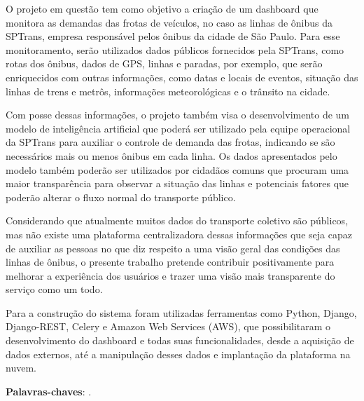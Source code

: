 \begin{resumo}
\indent
\par O projeto em questão tem como objetivo a criação de um dashboard que monitora as demandas das   frotas   de veículos, no caso as linhas de ônibus da SPTrans, empresa responsável pelos ônibus da cidade de São Paulo. Para esse monitoramento, serão utilizados dados públicos fornecidos pela SPTrans, como rotas dos ônibus, dados de GPS, linhas e paradas, por exemplo, que serão enriquecidos com outras informações, como datas e locais de eventos, situação das linhas de trens e metrôs, informações meteorológicas e o trânsito na cidade.
\par Com posse dessas informações, o projeto também visa o desenvolvimento de um modelo de inteligência artificial que poderá ser utilizado pela equipe operacional da SPTrans para auxiliar o controle de demanda das frotas, indicando se são necessários mais ou menos ônibus em cada linha. Os dados apresentados pelo modelo também poderão ser utilizados por cidadãos comuns que procuram uma maior transparência para observar a situação das linhas e potenciais fatores que poderão alterar o fluxo normal do transporte público.
\par Considerando que atualmente muitos dados do transporte coletivo são públicos, mas não existe uma plataforma centralizadora dessas informações que seja capaz de auxiliar as pessoas no que diz respeito a uma visão geral das condições das linhas de ônibus, o presente trabalho pretende contribuir positivamente para melhorar a experiência dos usuários e trazer uma visão mais transparente do serviço como um todo.
\par Para a construção do sistema foram utilizadas ferramentas como Python, Django, Django-REST, Celery e Amazon Web Services (AWS), que possibilitaram o desenvolvimento do dashboard e todas suas funcionalidades, desde a aquisição de dados externos, até a manipulação desses dados e implantação da plataforma na nuvem.
    
\textbf{Palavras-chaves}: \PalavraChaveA.~

\end{resumo}
